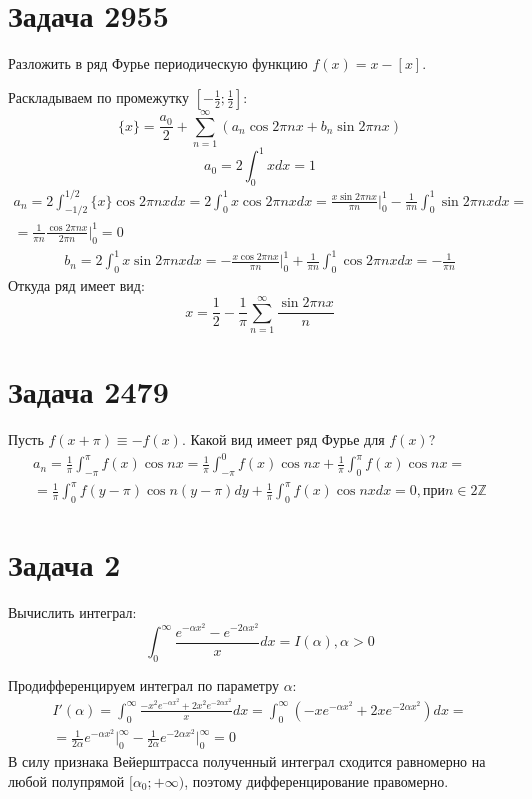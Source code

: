 \documentclass[11pt]{article}
\begin{document}
\section{Задача 2955}
\label{sec:orgd005bb5}
Разложить в ряд Фурье периодическую функцию \(f(x) = x - [x]\).

Раскладываем по промежутку \(\left[-\frac{1}2; \frac{1}2\right]\):
$$\{x\} = \frac{a_0}2 + \sum_{n = 1}^\infty(a_n\cos 2\pi nx + b_n\sin 2\pi nx)$$
$$a_0 = 2\int_0^1xdx = 1$$
\begin{multline*}
a_n = 2\int_{-1/2}^{1/2}\{x\}\cos 2\pi nxdx = 2\int_0^1x\cos 2\pi nxdx = \frac{x\sin 2\pi nx}{\pi n}\bigg|_0^1 - \frac{1}{\pi n}\int_0^1\sin 2\pi nxdx = \\
= \frac{1}{\pi n}\frac{\cos 2\pi nx}{2\pi n}\bigg|_0^1 = 0
\end{multline*}
\begin{multline*}
b_n = 2\int_0^1x\sin 2\pi nx dx = -\frac{x\cos 2\pi nx}{\pi n}\bigg|_0^1 + \frac{1}{\pi n}\int_0^1\cos 2\pi nxdx = -\frac{1}{\pi n}
\end{multline*}
Откуда ряд имеет вид:
$${x} = \frac{1}2 - \frac{1}\pi\sum_{n = 1}^\infty\frac{\sin 2\pi nx}n$$
\section{Задача 2479}
\label{sec:org80da984}
Пусть \(f(x + \pi) \equiv -f(x)\). Какой вид имеет ряд Фурье для \(f(x)\)?
\begin{multline*}
a_n = \frac{1}\pi\int_{-\pi}^\pi f(x)\cos nx = \frac{1}\pi\int_{-\pi}^0f(x)\cos nx + \frac{1}\pi\int_0^\pi f(x)\cos nx = \\
= \frac{1}\pi\int_0^\pi f(y - \pi)\cos n(y - \pi)dy + \frac{1}\pi\int_0^\pi f(x)\cos nxdx = 0, при n \in 2\mathbb{Z}
\end{multline*}
\section{Задача 2}
\label{sec:org35a88b9}
Вычислить интеграл:
$$\int_0^\infty\frac{e^{-\alpha x^2} - e^{-2\alpha x^2}}xdx = I(\alpha), \alpha > 0$$

Продифференцируем интеграл по параметру \(\alpha\):
\begin{multline*}
I'(\alpha) = \int_0^\infty\frac{-x^2e^{-\alpha x^2} + 2x^2e^{-2\alpha x^2}}xdx =
\int_0^\infty(-xe^{-\alpha x^2} + 2xe^{-2\alpha x^2})dx = \\
= \frac1{2\alpha}e^{-\alpha x^2}\bigg|_0^\infty - \frac1{2\alpha}{e^{-2\alpha x^2}\bigg|_0^\infty} = 0
\end{multline*}
В силу признака Вейерштрасса полученный интеграл сходится равномерно на любой полупрямой
\([\alpha_0; +\infty)\), поэтому дифференцирование правомерно.
\end{document}
